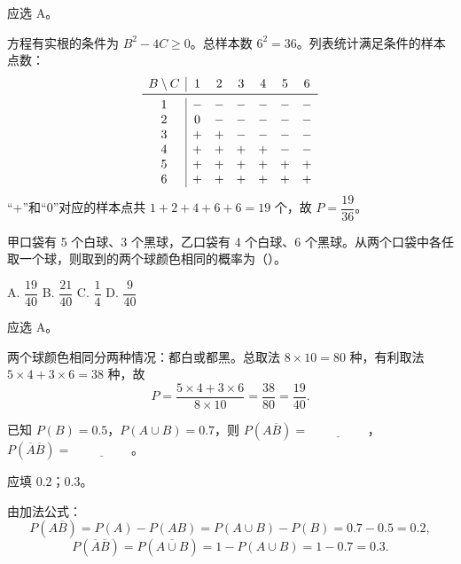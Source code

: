 \documentclass[lang=cn,11pt]{elegantbook}
\begin{document}
\begin{solution}
应选 A。

方程有实根的条件为 \(B^2-4C\ge 0\)。总样本数 \(6^2=36\)。列表统计满足条件的样本点数：
\[
\begin{array}{c|cccccc}
B\setminus C & 1 & 2 & 3 & 4 & 5 & 6 \\
\midrule
1 & - & - & - & - & - & - \\
2 & 0 & - & - & - & - & - \\
3 & + & + & - & - & - & - \\
4 & + & + & + & + & - & - \\
5 & + & + & + & + & + & + \\
6 & + & + & + & + & + & + \\
\end{array}
\]
``+''和``0''对应的样本点共 \(1+2+4+6+6=19\) 个，故 \(P=\dfrac{19}{36}\)。
\end{solution}

\begin{exercise}\label{exer:1-36}
甲口袋有 5 个白球、3 个黑球，乙口袋有 4 个白球、6 个黑球。从两个口袋中各任取一个球，则取到的两个球颜色相同的概率为（\quad）。\par
A. \(\dfrac{19}{40}\)\quad
B. \(\dfrac{21}{40}\)\quad
C. \(\dfrac{1}{4}\)\quad
D. \(\dfrac{9}{40}\)
\end{exercise}

\begin{solution}
应选 A。

两个球颜色相同分两种情况：都白或都黑。总取法 \(8\times10=80\) 种，有利取法 \(5\times4+3\times6=38\) 种，故
\[P = \frac{5\times4+3\times6}{8\times10} = \frac{38}{80} = \frac{19}{40}.\]
\end{solution}

\begin{exercise}\label{exer:1-45}
已知 \(P(B)=0.5\)，\(P(A\cup B)=0.7\)，则 \(P(A\overline{B})=\underline{\hspace{2cm}}\)，\(P(\overline{A}\overline{B})=\underline{\hspace{2cm}}\)。
\end{exercise}

\begin{solution}
应填 \(0.2\)；\(0.3\)。

由加法公式：
\[
P(A\overline{B}) = P(A) - P(AB) = P(A\cup B) - P(B) = 0.7 - 0.5 = 0.2,
\]
\[
P(\overline{A}\overline{B}) = P(\overline{A\cup B}) = 1 - P(A\cup B) = 1 - 0.7 = 0.3.
\]
\end{solution}
\end{document}
